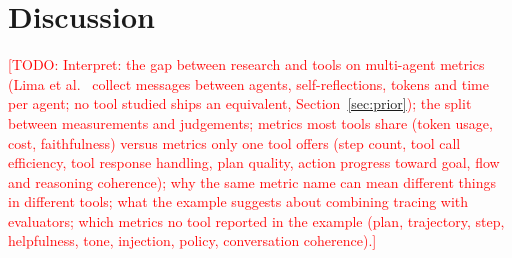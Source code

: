 \documentclass[conference]{IEEEtran}
\newcommand{\todo}[1]{\textcolor{red}{[TODO: #1]}}
\begin{document}
\section{Discussion}\label{sec:discussion}
\todo{Interpret: the gap between research and tools on multi-agent metrics (Lima et al.~\cite{lima2026catalogue} collect messages between agents, self-reflections, tokens and time per agent; no tool studied ships an equivalent, Section~\ref{sec:prior}); the split between measurements and judgements; metrics most tools share (token usage, cost, faithfulness) versus metrics only one tool offers (step count, tool call efficiency, tool response handling, plan quality, action progress toward goal, flow and reasoning coherence); why the same metric name can mean different things in different tools; what the example suggests about combining tracing with evaluators; which metrics no tool reported in the example (plan, trajectory, step, helpfulness, tone, injection, policy, conversation coherence).}
\end{document}
